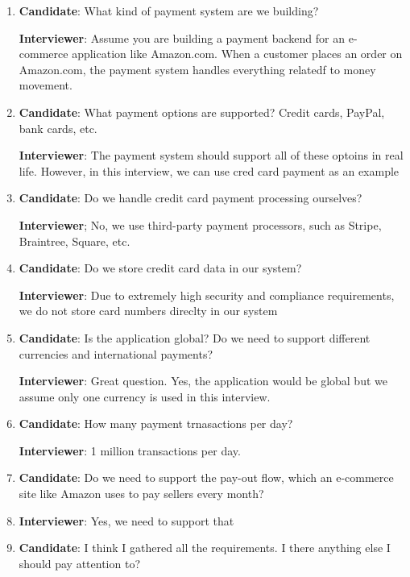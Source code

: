 \documentclass{report}
\theoremstyle{definition}
\begin{document}
\begin{enumerate}
\item
\textbf{Candidate}: What kind of payment system are we building?

\textbf{Interviewer}: Assume you are building a payment backend for an e-commerce application like Amazon.com. When a customer places an order on Amazon.com, the payment system handles everything relatedf to money movement.

\item
\textbf{Candidate}: What payment options are supported? Credit cards, PayPal, bank cards, etc.

\textbf{Interviewer}: The payment system should support all of these optoins in real life. However, in this interview, we can use cred card payment as an example

\item
\textbf{Candidate}: Do we handle credit card payment processing ourselves?

\textbf{Interviewer}; No, we use third-party payment processors, such as Stripe, Braintree, Square, etc.

\item
\textbf{Candidate}: Do we store credit card data in our system?

\textbf{Interviewer}: Due to extremely high security and compliance requirements, we do not store card numbers direclty in our system

\item

\textbf{Candidate}: Is the application global? Do we need to support different currencies and international payments?

\textbf{Interviewer}: Great question. Yes, the application would be global but we assume only one currency is used in this interview.

\item
\textbf{Candidate}: How many payment trnasactions per day?

\textbf{Interviewer}: 1 million transactions per day.

\item
\textbf{Candidate}: Do we need to support the pay-out flow, which an e-commerce site like Amazon uses to pay sellers every month?
\item
\textbf{Interviewer}: Yes, we need to support that

\item
\textbf{Candidate}: I think I gathered all the requirements. I there anything else I should pay attention to?


\end{enumerate}
\end{document}
